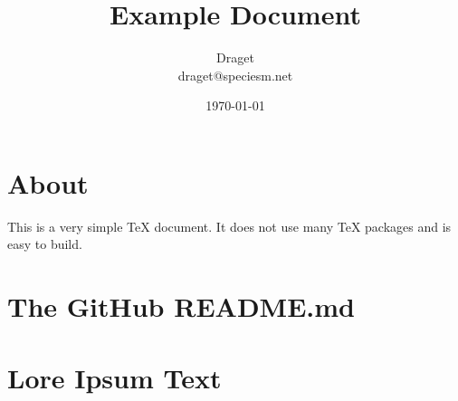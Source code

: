 \documentclass[a4paper]{article}
\title{Example Document}
\author{Draget\\draget@speciesm.net}
\date{\today}
\begin{document}
\maketitle
\newpage

\tableofcontents
\newpage

\section{About}
This is a very simple TeX document. It does not use many TeX packages and is easy to build.

\section{The GitHub README.md}


\section{Lore Ipsum Text}

\end{document}

